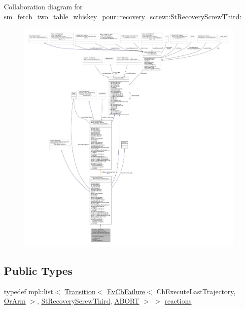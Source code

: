 Collaboration diagram for sm\+\_\+fetch\+\_\+two\+\_\+table\+\_\+whiskey\+\_\+pour\+:\+:recovery\+\_\+screw\+:\+:St\+Recovery\+Screw\+Third\+:
\nopagebreak
\begin{figure}[H]
\begin{center}
\leavevmode
\includegraphics[width=350pt]{structsm__fetch__two__table__whiskey__pour_1_1recovery__screw_1_1StRecoveryScrewThird__coll__graph}
\end{center}
\end{figure}
\subsection*{Public Types}
\begin{DoxyCompactItemize}
\item 
typedef mpl\+::list$<$ \hyperlink{classsmacc_1_1Transition}{Transition}$<$ \hyperlink{structsmacc_1_1EvCbFailure}{Ev\+Cb\+Failure}$<$ Cb\+Execute\+Last\+Trajectory, \hyperlink{classsm__fetch__two__table__whiskey__pour_1_1OrArm}{Or\+Arm} $>$, \hyperlink{structsm__fetch__two__table__whiskey__pour_1_1recovery__screw_1_1StRecoveryScrewThird}{St\+Recovery\+Screw\+Third}, \hyperlink{structsmacc_1_1default__transition__tags_1_1ABORT}{A\+B\+O\+RT} $>$ $>$ \hyperlink{structsm__fetch__two__table__whiskey__pour_1_1recovery__screw_1_1StRecoveryScrewThird_a0469d0ce4b3b80dacb97538408dfcaf9}{reactions}
\end{DoxyCompactItemize}
